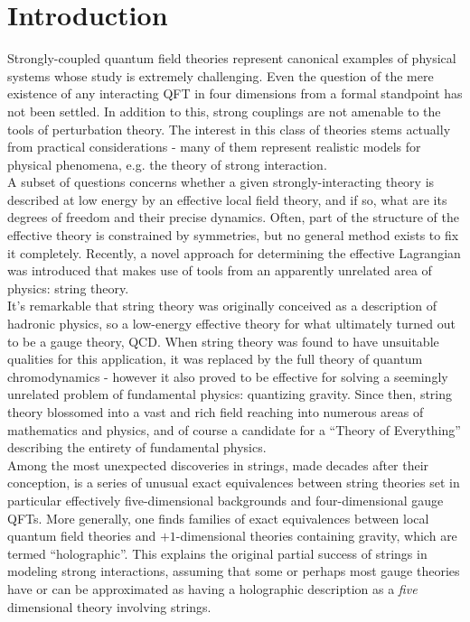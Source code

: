 \section{Introduction}

Strongly-coupled quantum field theories represent canonical examples of physical systems whose study is extremely challenging. Even the question of the mere existence of any interacting QFT in four dimensions from a formal standpoint has not been settled. In addition to this, strong couplings are not amenable to the tools of perturbation theory. The interest in this class of theories stems actually from practical considerations - many of them represent realistic models for physical phenomena, e.g. the theory of strong interaction.\\

A subset of questions concerns whether a given strongly-interacting theory is described at low energy by an effective local field theory, and if so, what are its degrees of freedom and their precise dynamics. Often, part of the structure of the effective theory is constrained by symmetries, but no general method exists to fix it completely. Recently\cite{MZ}, a novel approach for determining the effective Lagrangian was introduced that makes use of tools from an apparently unrelated area of physics: string theory.\\

It's remarkable that string theory was originally conceived as a description of hadronic physics, so a low-energy effective theory for what ultimately turned out to be a gauge theory, QCD. When string theory was found to have unsuitable qualities for this application, it was replaced by the full theory of quantum chromodynamics - however it also proved to be effective for solving a seemingly unrelated problem of fundamental physics: quantizing gravity. Since then, string theory blossomed into a vast and rich field reaching into numerous areas of mathematics and physics, and of course a candidate for a ``Theory of Everything'' describing the entirety of fundamental physics.\\


Among the most unexpected discoveries in strings, made decades after their conception, is a series of unusual exact equivalences between string theories set in particular effectively five-dimensional backgrounds and four-dimensional gauge QFTs. More generally, one finds families of exact equivalences between local quantum field theories and $+1$-dimensional theories containing gravity, which are termed ``holographic''. This explains the original partial success of strings in modeling strong interactions, assuming that some or perhaps most gauge theories have or can be approximated as having a holographic description as a \emph{five} dimensional theory involving strings.\\

